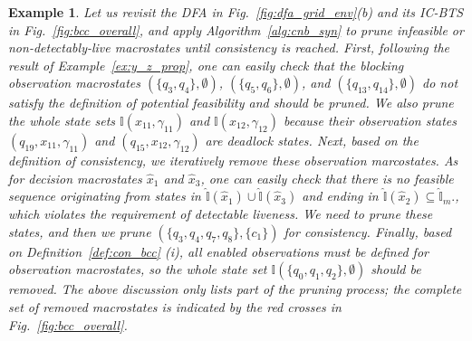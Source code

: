 \documentclass[twocolumn]{autart}
\newtheorem{myexm}{Example}
\newtheorem{remark}{Remark}
\begin{document}
\begin{myexm}\label{ex:cnb_removal}
    Let us revisit the DFA in Fig.~\ref{fig:dfa_grid_env}(b) and its IC-BTS in Fig.~\ref{fig:bcc_overall}, and apply Algorithm~\ref{alg:cnb_syn} to prune infeasible or non-detectably-live macrostates until consistency is reached.
    First, following the result of Example~\ref{ex:y_z_prop}, one can easily check that the blocking observation macrostates $(\{q_3, q_4\}, \emptyset)$, $(\{q_5, q_6\}, \emptyset)$, and $(\{q_{13}, q_{14}\}, \emptyset)$ do not satisfy the definition of potential feasibility and should be pruned.
    We also prune the whole state sets 
    $
    \mathbb{I}(x_{11},\gamma_{11})
    $
    and
    $
    \mathbb{I}(x_{12},\gamma_{12})
    $ 
    because their observation states $(q_{19}, x_{11}, \gamma_{11})$ and $(q_{15}, x_{12}, \gamma_{12})$ are deadlock states.
    Next, based on the definition of consistency, we iteratively remove these observation marcostates.
    As for decision macrostates $\hat{x}_{1}$ and $\hat{x}_{3}$, one can easily check that there is no feasible sequence originating from states in
    $
    \hat{\mathbb{I}}(\hat{x}_1)\cup\hat{\mathbb{I}}(\hat{x}_3)
    $
    and ending in
    $
    \hat{\mathbb{I}}(\hat{x}_2)\subseteq \hat{\mathbb{I}}_m.
    $, which violates the requirement of detectable liveness.
    We need to prune these states, and then we prune $(\{q_3, q_4, q_7, q_8\}, \{ c_1 \})$ for consistency.
    Finally, based on Definition~\ref{def:con_bcc} (i), all enabled observations must be defined for observation macrostates, so the whole state set
    $
    \mathbb{I}(\{q_0,q_1,q_2\},\emptyset)
    $
    should be removed.
    The above discussion only lists part of the pruning process; the complete set of removed macrostates is indicated by the red crosses in Fig.~\ref{fig:bcc_overall}.
\end{myexm}


\end{document}

